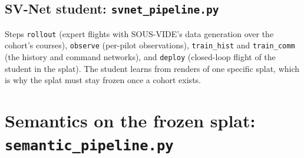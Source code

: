 \documentclass[11pt,a4paper]{article}
\newcommand{\code}[1]{\texttt{#1}}
\begin{document}
\subsection{SV-Net student: \texorpdfstring{\code{svnet\_pipeline.py}}{svnet\_pipeline.py}}
Steps \code{rollout} (expert flights with SOUS-VIDE's data generation over the cohort's courses),
\code{observe} (per-pilot observations), \code{train\_hist} and \code{train\_comm} (the history and
command networks), and \code{deploy} (closed-loop flight of the student in the splat). The student
learns from renders of one specific splat, which is why the splat must stay frozen once a cohort
exists.

\section{Semantics on the frozen splat: \texorpdfstring{\code{semantic\_pipeline.py}}{semantic\_pipeline.py}}\label{sec:sem}
\end{document}
